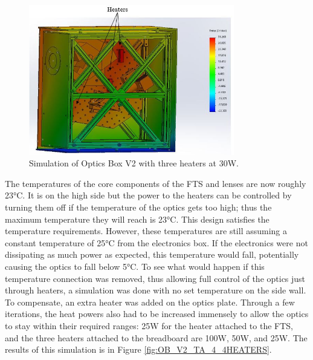 \begin{figure}
    \centering
    \includegraphics[width=0.8\textwidth]{chap3_images/LIFE_V2_images/TA_25_-20_no_front_wall_three_heaters_labelled.JPG}
    \caption{Simulation of Optics Box V2 with three heaters at 30W.}
    \label{fig:OB_V2_TA_3_3HEATERS}
\end{figure}

The temperatures of the core components of the FTS and lenses are now roughly 23°C. It is on the high side but the power to the heaters can be controlled by turning them off if the temperature of the optics gets too high; thus the maximum temperature they will reach is 23°C. This design satisfies the temperature requirements. However, these temperatures are still assuming a constant temperature of 25°C from the electronics box. If the electronics were not dissipating as much power as expected, this temperature would fall, potentially causing the optics to fall below 5°C. To see what would happen if this temperature connection was removed, thus allowing full control of the optics just through heaters, a simulation was done with no set temperature on the side wall. To compensate, an extra heater was added on the optics plate. Through a few iterations, the heat powers also had to be increased immensely to allow the optics to stay within their required ranges: 25W for the heater attached to the FTS, and the three heaters attached to the breadboard are 100W, 50W, and 25W. The results of this simulation is in Figure \ref{fig:OB_V2_TA_4_4HEATERS}.

